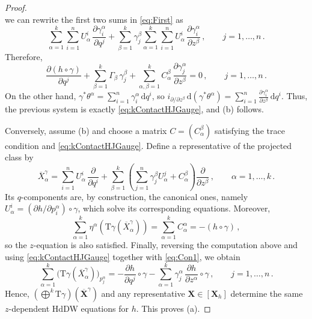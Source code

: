 \documentclass[11pt,twoside]{article}
\theoremstyle{plain}
\theoremstyle{definition}
\theoremstyle{remark}
\newcommand{\dd}{\mathrm{d}}
\newcommand{\T}{\mathrm{T}}
\begin{document}
\begin{proof}
\[    \]
    we can rewrite the first two sums in \eqref{eq:First} as
    \[
        \sum_{\alpha=1}^k\sum_{i=1}^n U^i_\alpha\,\frac{\partial \gamma_i^\alpha}{\partial q^j}+\sum_{\beta=1}^k\gamma_j^\beta\sum_{\alpha=1}^k\sum_{i=1}^n U^i_\alpha\,\frac{\partial \gamma_i^\alpha}{\partial z^\beta}\,,\qquad j=1,\ldots,n\,.
    \]
    Therefore,
    \[
        \frac{\partial(h\circ\gamma)}{\partial q^j}+\sum_{\beta=1}^k\Gamma_\beta\,\gamma_j^\beta+\sum_{\alpha,\beta=1}^k C_\alpha^\beta\,\frac{\partial \gamma_j^\alpha}{\partial z^\beta}=0\,,\qquad j=1,\dots,n\,.
    \]
    On the other hand, \(\gamma^*\theta^\alpha=\sum_{i=1}^n\gamma_i^\alpha\,\dd q^i\), so \(i_{\partial/\partial z^\beta}\,\dd(\gamma^*\theta^\alpha)=\sum_{i=1}^n\frac{\partial \gamma_i^\alpha}{\partial z^\beta}\,\dd q^i\). Thus, the previous system is exactly \eqref{eq:kContactHJGauge}, and (b) follows. 
    
    Conversely, assume (b) and choose a matrix \(C=(C_\alpha^\beta)\) satisfying the trace condition and \eqref{eq:kContactHJGauge}. Define a representative of the projected class by
    \[
        \overline X_\alpha^\gamma=\sum_{i=1}^n U^i_\alpha\,\frac{\partial}{\partial q^i}+\sum_{\beta=1}^k\left(\sum_{j=1}^n \gamma_j^\beta U^j_\alpha+C_\alpha^\beta\right)\frac{\partial}{\partial z^\beta}\,,\qquad \alpha=1,\dots,k\,.
    \]
    Its \(q\)-components are, by construction, the canonical ones, namely \(U^i_\alpha=(\partial h/\partial p_i^\alpha)\circ\gamma\), which solve its corresponding equations. Moreover,
    \[
        \sum_{\alpha=1}^k\eta^\alpha\!\left(\T\gamma(\overline X_\alpha^\gamma)\right)=\sum_{\alpha=1}^k C_\alpha^\alpha=-(h\circ\gamma)\,,
    \]
    so the \(z\)-equation is also satisfied. Finally, reversing the computation above and using \eqref{eq:kContactHJGauge} together with \eqref{eq:Con1}, we obtain
    \[
        \sum_{\alpha=1}^k\bigl(\T\gamma(\overline X_\alpha^\gamma)\bigr)_{p_j^\alpha}=-\frac{\partial h}{\partial q^j}\!\circ\gamma-\sum_{\alpha=1}^k \gamma_j^\alpha\,\frac{\partial h}{\partial z^\alpha}\!\circ\gamma\,,\qquad j=1,\dots,n\,.
    \]
    Hence, \((\bigoplus^k\T\gamma)(\overline{\mathbf X}^{\gamma})\) and any representative \(\mathbf X\in[\mathbf X_h]\) determine the same \(z\)-dependent HdDW equations for \(h\). This proves (a).
\end{proof}
\end{document}
